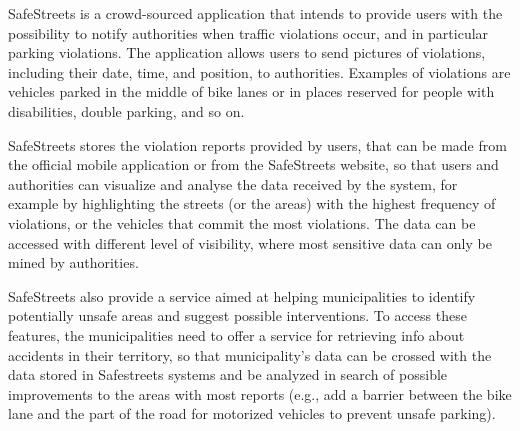 SafeStreets is a crowd-sourced application that intends to provide users with the possibility to notify authorities when traffic violations occur, and in particular parking violations. The application allows users to send pictures of violations, including their date, time, and position, to authorities. Examples of violations are vehicles parked in the middle of bike lanes or in places reserved for people with disabilities, double parking, and so on.

SafeStreets stores the violation reports provided by users, that can be made from the official mobile application or from the SafeStreets website, so that users and authorities can visualize and analyse the data received by the system, for example by highlighting the streets (or the areas) with the highest frequency of violations, or the vehicles that commit the most violations. The data can be accessed with different level of visibility, where most sensitive data can only be mined by authorities.

SafeStreets also provide a service aimed at helping municipalities to identify potentially unsafe areas and suggest possible interventions. To access these features, the municipalities need to offer a service for retrieving info about accidents in their territory, so that municipality's data can be crossed with the data stored in Safestreets systems and be analyzed in search of possible improvements to the areas with most reports (e.g., add a barrier between the bike lane and the part of the road for motorized vehicles to prevent unsafe parking).